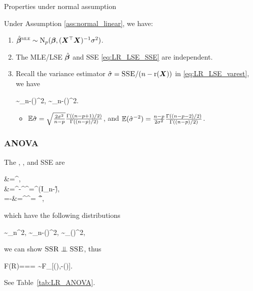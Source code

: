 \documentclass[10pt,a4paper]{book}
\begin{document}
\begin{thmbox}{Properties under normal assumption}
	\begin{proposition}\label{prop:LR_full_rank_normal_prop} Under Assumption \ref{ass:normal_linear}, we have:
		\begin{enumerate}
			\item $\hat{{\boldsymbol\beta}}^{\textsc{mle}}\sim\mathrm{N}_p({\boldsymbol\beta},({\boldsymbol X}^\top{\boldsymbol X})^{-1}\sigma^2)$. 
			\item The MLE/LSE $\hat{{\boldsymbol\beta}}$ and SSE \eqref{eq:LR_LSE_SSE} are independent.
			\item Recall the variance estimator $\hat{\sigma}=\textsc{SSE}/(n-\mathrm{r}({\boldsymbol X}))$ in \eqref{eq:LR_LSE_varest}, we have \begin{salign*}
				\sim\chi_{n-\rmr(\X)}^2, \quad {} \quad {}\sim\chi_{n-\rmr(\X)}^2.
			\end{salign*}
			\begin{itemize}
				\item $\mathbb E\hat{\sigma}=\sqrt{\frac{2\sigma^2}{n-p}}\frac{\Gamma((n-p+1)/2)}{\Gamma((n-p)/2)}$, and $\mathbb E(\hat{\sigma}^{-2})=\frac{n-p}{2\sigma^2}\frac{\Gamma((n-p-2)/2)}{\Gamma((n-p)/2)}$.
			\end{itemize}
		\end{enumerate}
	\end{proposition}
\end{thmbox}

\subsubsection{ANOVA}\label{sec:LR_full_rank_normal_ANOVA}

The , , and SSE are 
\begin{salign*}
	\SST&=\Y^\TT\Y,\\
	\SSE&=\Y^\TT\Y-\hat{\bab}^\TT\X^\TT\Y=\Y^\TT (I_n-\H)\Y,\\
	\SSR=\SST-\SSE&=\hat{\bab}^\TT\X^\TT\Y= \Y^\TT\H\Y,
\end{salign*}
which have the following distributions
\begin{salign*}
	\sim\chi_{n}^2, \quad 
	\sim\chi_{n-\rmr(\X)}^2, \quad
	\sim\chi_{\rmr(\X)}^2, 
\end{salign*}
we can show $\SSR\indep\SSE$, thus
\begin{salign*}
	F(R)=\frac{\MSR}{\MSE}== \sim \textsc{F}_{[\rmr(\X),\n-\rmr(\X)]}.
\end{salign*}
See Table~\ref{tab:LR_ANOVA}.
\end{document}
